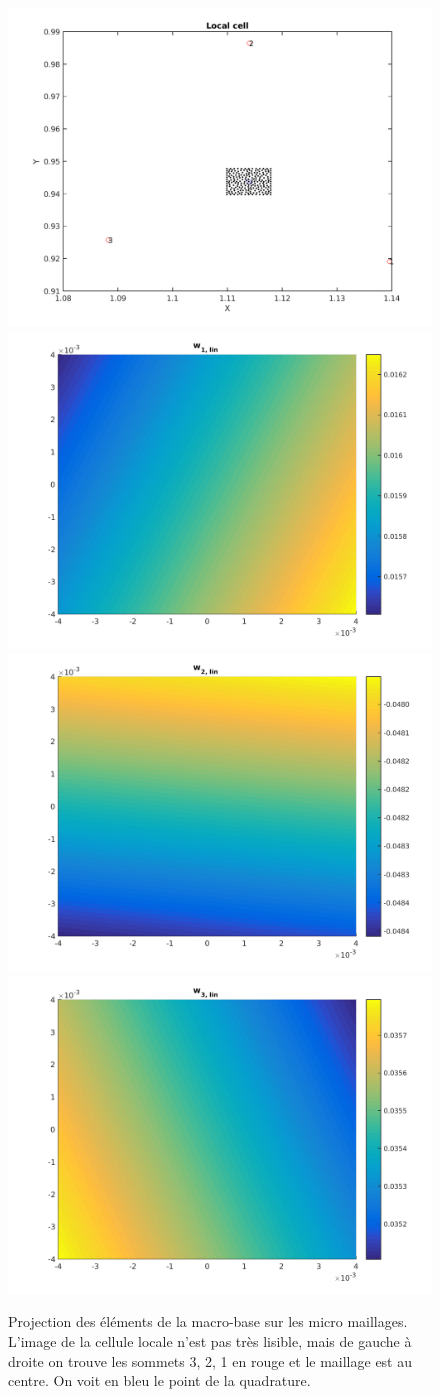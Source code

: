 \documentclass[11pt]{article}
\begin{document}
\begin{figure}
  \centering
  \includegraphics[width=.5\textwidth]{Code/local_cell.png} 
  \includegraphics[width=.45\textwidth]{Code/w1lin.png} \\
  \includegraphics[width=.45\textwidth]{Code/w2lin.png}
  \includegraphics[width=.45\textwidth]{Code/w3lin.png}
  \caption{Projection des éléments de la macro-base sur les micro maillages. L'image de la cellule locale n'est pas très lisible, mais de gauche à
    droite on trouve les sommets 3, 2, 1 en rouge et le maillage est au centre. On voit en bleu le point de la quadrature. }
  \label{fig:wlins}
\end{figure}
\end{document}
